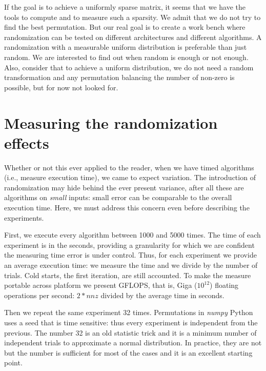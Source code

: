 \documentclass[acmsmall]{acmart}
\begin{document}

If the goal is to achieve a uniformly sparse matrix, it seems that we
have the tools to compute and to measure such a sparsity. We admit
that we do not try to find the best permutation. But our real goal is
to create a work bench where randomization can be tested on different
architectures and different algorithms. A randomization with a
measurable uniform distribution is preferable than just random. We are
interested to find out when random is enough or not enough. Also,
consider that to achieve a uniform distribution, we do not need a
random transformation and any permutation balancing the number of
non-zero is possible, but for now not looked for.

\section{Measuring the randomization effects}
\label{sec:measuring}

Whether or not this ever applied to the reader, when we have timed
algorithms (i.e., measure execution time), we came to expect
variation.  The introduction of randomization may hide behind the ever
present variance, after all these are algorithms on {\em small}
inputs: small error can be comparable to the overall execution
time. Here, we must address this concern even before describing the
experiments.

First, we execute every algorithm between 1000 and 5000 times. The
time of each experiment is in the seconds, providing a granularity for
which we are confident the measuring time error is under
control. Thus, for each experiment we provide an average execution
time: we measure the time and we divide by the number of trials. Cold
starts, the first iteration, are still accounted. To make the measure
portable across platform we present GFLOPS, that is, Giga ($10^{12}$)
floating operations per second: $2*nnz$ divided by the average time in
seconds. 

Then we repeat the same experiment 32 times. Permutations in {\em
  numpy} Python uses a seed that is time sensitive: thus every
experiment is independent from the previous. The number 32 is an old
statistic trick and it is a minimum number of independent trials to
approximate a normal distribution. In practice, they are not but the
number is sufficient for most of the cases and it is an excellent
starting point.
\end{document}
